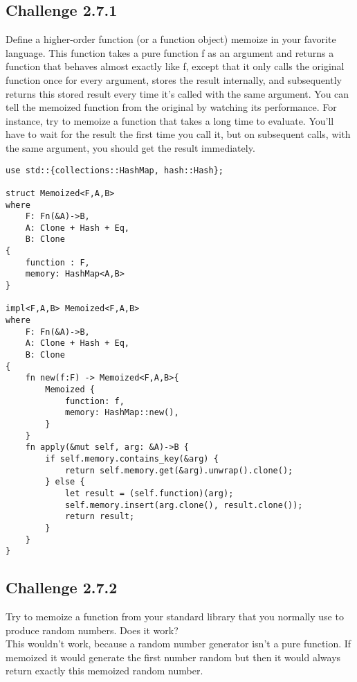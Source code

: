 \documentclass[11pt]{article}
\begin{document}
    \subsection*{Challenge 2.7.1}
        Define a higher-order function (or a function object) memoize in
        your favorite language. This function takes a pure function f as
        an argument and returns a function that behaves almost exactly
        like f, except that it only calls the original function once for every
        argument, stores the result internally, and subsequently returns
        this stored result every time it’s called with the same argument.
        You can tell the memoized function from the original by watching
        its performance. For instance, try to memoize a function that
        takes a long time to evaluate. You’ll have to wait for the result
        the first time you call it, but on subsequent calls, with the same
        argument, you should get the result immediately. \\
        \begin{lstlisting}
use std::{collections::HashMap, hash::Hash};

struct Memoized<F,A,B>
where
    F: Fn(&A)->B,
    A: Clone + Hash + Eq,
    B: Clone
{
    function : F,
    memory: HashMap<A,B>
}

impl<F,A,B> Memoized<F,A,B>
where
    F: Fn(&A)->B,
    A: Clone + Hash + Eq,
    B: Clone
{
    fn new(f:F) -> Memoized<F,A,B>{
        Memoized {
            function: f,
            memory: HashMap::new(),
        }
    }
    fn apply(&mut self, arg: &A)->B {
        if self.memory.contains_key(&arg) {
            return self.memory.get(&arg).unwrap().clone();
        } else {
            let result = (self.function)(arg);
            self.memory.insert(arg.clone(), result.clone());
            return result;
        }
    }
}
        \end{lstlisting}

    \subsection*{Challenge 2.7.2}
        Try to memoize a function from your standard library that you
        normally use to produce random numbers. Does it work?\\
        This wouldn't work, because a random number generator isn't a pure function. If memoized it would generate the first number random but then it would always return exactly this memoized random number.
\end{document}
